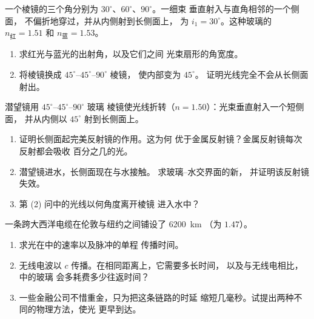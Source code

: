 \begin{exercise}[$\star\star\star$]\label{exo:g10:refraction:13}
一个棱镜的三个角分别为 $30^\circ$、$60^\circ$、$90^\circ$。一细束
垂直射入与直角相邻的一个侧面，
不偏折地穿过，并从内侧射到长侧面上，
为 $i_1 = 30^\circ$。这种玻璃的 $n_{\text{红}} = 1.51$ 和
$n_{\text{蓝}} = 1.53$。
\begin{enumerate}
  \item 求红光与蓝光的出射角，以及它们之间
        光束扇形的角宽度。
  \item 将棱镜换成 $45^\circ$--$45^\circ$--$90^\circ$ 棱镜，
        使内部变为 $45^\circ$。
        证明光线完全不会从长侧面射出。
\end{enumerate}
\end{exercise}

\begin{exercise}[$\star\star\star$]\label{exo:g10:refraction:14}
潜望镜用 $45^\circ$--$45^\circ$--$90^\circ$ 玻璃
棱镜使光线折转（$n = 1.50$）：光束垂直射入一个短侧面，
并从内侧以 $45^\circ$ 射到长侧面上。
\begin{enumerate}
  \item 证明长侧面起完美反射镜的作用。这为何
        优于金属反射镜？金属反射镜每次反射都会吸收
        百分之几的光。
  \item 潜望镜进水，长侧面现在与水接触。
        求玻璃–水交界面的新，
        并证明该反射镜失效。
  \item 第 (2) 问中的光线以何角度离开棱镜
        进入水中？
\end{enumerate}
\end{exercise}

\begin{exercise}[$\star\star\star$]\label{exo:g10:refraction:15}
一条跨大西洋电缆在伦敦与纽约之间铺设了
\qty{6200}{km} （为 $1.47$）。
\begin{enumerate}
  \item 求光在中的速率以及脉冲的单程
        传播时间。
  \item 无线电波以 $c$ 传播。在相同距离上，它需要多长时间，
        以及与无线电相比，中的玻璃
        会多耗费多少往返时间？
  \item 一些金融公司不惜重金，只为把这条链路的时延
        缩短几毫秒。试提出两种不同的物理方法，使光
        更早到达。
\end{enumerate}
\end{exercise}

